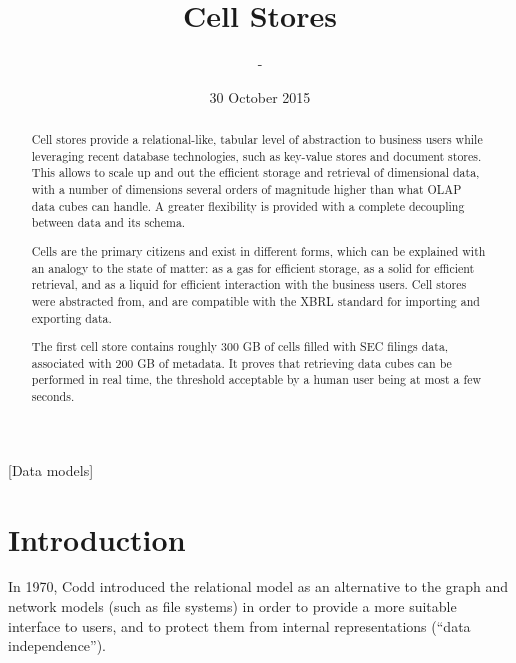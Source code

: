 \documentclass{acm_proc_article-sp}
\begin{document}
\title{Cell Stores}


\author{
\alignauthor
-
}
\date{30 October 2015}
\maketitle

\begin{abstract}
Cell stores provide a relational-like, tabular level of abstraction to business users while leveraging recent database technologies, such as key-value stores and document stores. This allows to scale up and out the efficient storage and retrieval of dimensional data, with a number of dimensions several orders of magnitude higher than what OLAP data cubes can handle. A greater flexibility is provided with a complete decoupling between data and its schema.

Cells are the primary citizens and exist in different forms, which can be explained with an analogy to the state of matter: as a gas for efficient storage, as a solid for efficient retrieval, and as a liquid for efficient interaction with the business users. Cell stores were abstracted from, and are compatible with the XBRL standard for importing and exporting data.

The first cell store contains roughly 300 GB of cells filled with SEC filings data, associated with 200 GB of metadata. It proves that retrieving data cubes can be performed in real time, the threshold acceptable by a human user being at most a few seconds.
\end{abstract}

[Data models]



\section{Introduction}
In 1970, Codd \cite{Codd1970} introduced the relational model as an alternative to the graph and network models (such as file systems) in order to provide a more suitable interface to users, and to protect them from internal representations (``data independence'').
\end{document}
